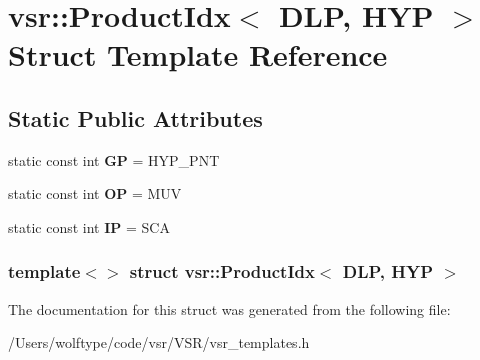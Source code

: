 \hypertarget{structvsr_1_1_product_idx_3_01_d_l_p_00_01_h_y_p_01_4}{\section{vsr\-:\-:Product\-Idx$<$ D\-L\-P, H\-Y\-P $>$ Struct Template Reference}
\label{structvsr_1_1_product_idx_3_01_d_l_p_00_01_h_y_p_01_4}
}
\subsection*{Static Public Attributes}
\begin{DoxyCompactItemize}
\item 
\hypertarget{structvsr_1_1_product_idx_3_01_d_l_p_00_01_h_y_p_01_4_a330dd57550f0aa2b684f467cad2ffa07}{static const int {\bfseries G\-P} = H\-Y\-P\-\_\-\-P\-N\-T}\label{structvsr_1_1_product_idx_3_01_d_l_p_00_01_h_y_p_01_4_a330dd57550f0aa2b684f467cad2ffa07}

\item 
\hypertarget{structvsr_1_1_product_idx_3_01_d_l_p_00_01_h_y_p_01_4_a15db3d26985d02a03ccaab9ac2ee2c00}{static const int {\bfseries O\-P} = M\-U\-V}\label{structvsr_1_1_product_idx_3_01_d_l_p_00_01_h_y_p_01_4_a15db3d26985d02a03ccaab9ac2ee2c00}

\item 
\hypertarget{structvsr_1_1_product_idx_3_01_d_l_p_00_01_h_y_p_01_4_a7bed567282e9d722fb1a99b9d37a3427}{static const int {\bfseries I\-P} = S\-C\-A}\label{structvsr_1_1_product_idx_3_01_d_l_p_00_01_h_y_p_01_4_a7bed567282e9d722fb1a99b9d37a3427}

\end{DoxyCompactItemize}
\subsubsection*{template$<$$>$ struct vsr\-::\-Product\-Idx$<$ D\-L\-P, H\-Y\-P $>$}



The documentation for this struct was generated from the following file\-:\begin{DoxyCompactItemize}
\item 
/\-Users/wolftype/code/vsr/\-V\-S\-R/vsr\-\_\-templates.\-h\end{DoxyCompactItemize}
